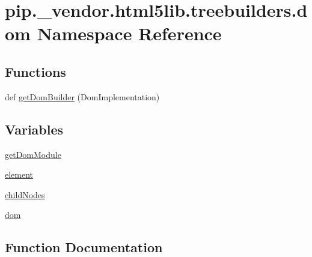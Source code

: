 \hypertarget{namespacepip_1_1__vendor_1_1html5lib_1_1treebuilders_1_1dom}{}\section{pip.\+\_\+vendor.\+html5lib.\+treebuilders.\+dom Namespace Reference}
\label{namespacepip_1_1__vendor_1_1html5lib_1_1treebuilders_1_1dom}
\subsection*{Functions}
\begin{DoxyCompactItemize}
\item 
def \hyperlink{namespacepip_1_1__vendor_1_1html5lib_1_1treebuilders_1_1dom_a5b048eba2d4f6cee7b9a7ef7649c4352}{get\+Dom\+Builder} (Dom\+Implementation)
\end{DoxyCompactItemize}
\subsection*{Variables}
\begin{DoxyCompactItemize}
\item 
\hyperlink{namespacepip_1_1__vendor_1_1html5lib_1_1treebuilders_1_1dom_a1f03c8064a36f11c665c36b373ae749a}{get\+Dom\+Module}
\item 
\hyperlink{namespacepip_1_1__vendor_1_1html5lib_1_1treebuilders_1_1dom_a36965ff7ca98ea83772d4857184dedbc}{element}
\item 
\hyperlink{namespacepip_1_1__vendor_1_1html5lib_1_1treebuilders_1_1dom_abbd3772834805fec385d2d6ba0489f26}{child\+Nodes}
\item 
\hyperlink{namespacepip_1_1__vendor_1_1html5lib_1_1treebuilders_1_1dom_a4eba72d3ee40a3f4e61f5068c2847ece}{dom}
\end{DoxyCompactItemize}


\subsection{Function Documentation}
\mbox{\label{namespacepip_1_1__vendor_1_1html5lib_1_1treebuilders_1_1dom_a5b048eba2d4f6cee7b9a7ef7649c4352}} 
